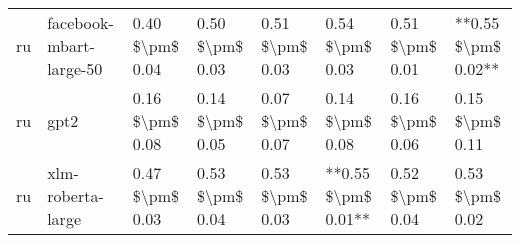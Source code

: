 \begin{tabular}{llllllll}
      ru &            facebook-mbart-large-50 & 0.40 \$\textbackslash pm\$ 0.04 &           0.50 \$\textbackslash pm\$ 0.03 &       0.51 \$\textbackslash pm\$ 0.03 &        0.54 \$\textbackslash pm\$ 0.03 &                         0.51 \$\textbackslash pm\$ 0.01 & **0.55 \$\textbackslash pm\$ 0.02** \\
      ru &                               gpt2 & 0.16 \$\textbackslash pm\$ 0.08 &           0.14 \$\textbackslash pm\$ 0.05 &       0.07 \$\textbackslash pm\$ 0.07 &        0.14 \$\textbackslash pm\$ 0.08 &                         0.16 \$\textbackslash pm\$ 0.06 &     0.15 \$\textbackslash pm\$ 0.11 \\
      ru &                  xlm-roberta-large & 0.47 \$\textbackslash pm\$ 0.03 &           0.53 \$\textbackslash pm\$ 0.04 &       0.53 \$\textbackslash pm\$ 0.03 &    **0.55 \$\textbackslash pm\$ 0.01** &                         0.52 \$\textbackslash pm\$ 0.04 &     0.53 \$\textbackslash pm\$ 0.02 \\
\bottomrule
\end{tabular}
